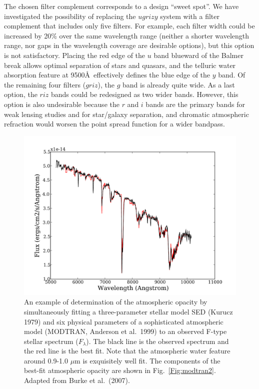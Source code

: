 The chosen filter complement corresponds to a design ``sweet spot''. We have
investigated the possibility of replacing the $ugrizy$ system with a
filter complement that includes only five filters. For example, each filter
width could be increased by 20\% over the same wavelength range (neither a
shorter wavelength range, nor gaps in the wavelength coverage are desirable
options), but this option is not satisfactory. Placing the red edge of the $u$
band blueward of the Balmer break allows optimal separation of stars and
quasars, and the telluric water absorption feature at 9500\AA\
effectively defines the blue edge of the $y$ band. Of the remaining four
filters ($griz$), the $g$ band is already quite wide. As a last option, the
$riz$ bands could be redesigned as two wider bands. However, this option is also
undesirable because the $r$ and $i$ bands are the primary bands for weak
lensing studies and for star/galaxy separation, and chromatic atmospheric
refraction would worsen the point spread function for a wider bandpass.


\begin{figure}
\hskip -0.12in
\includegraphics[width=1.1\hsize,clip]{modtran1.pdf}
\caption{An example of determination of the atmospheric opacity by
simultaneously fitting a three-parameter stellar model SED (Kurucz 1979) and
six physical parameters of a sophisticated atmospheric model (MODTRAN, Anderson
et al.~1999) to an observed F-type stellar spectrum ($F_\lambda$). The black
line is the observed spectrum and the red line is the best fit. Note that the
atmospheric water feature around 0.9-1.0 $\mu$m is exquisitely well fit.
The components of the best-fit atmospheric opacity are shown in
Fig.~\ref{Fig:modtran2}. Adapted from Burke et al.~(2007).}
\label{Fig:modtran1}
\end{figure}

